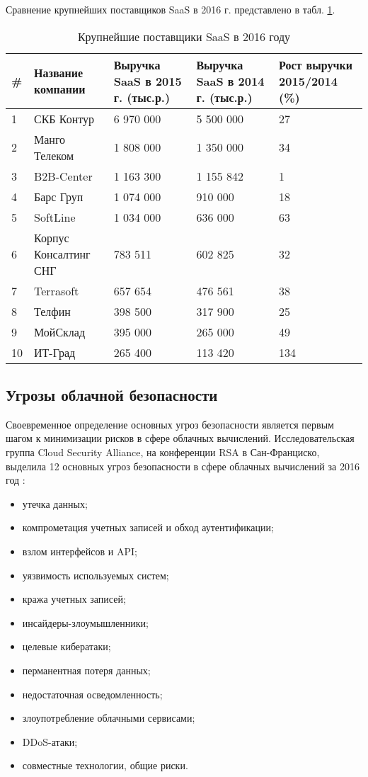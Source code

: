 Сравнение крупнейших поставщиков SaaS в 2016 г. \cite{cnews} представлено в табл. \ref{saas-table}.
\begin{table}[H]
  \caption{Крупнейшие поставщики SaaS в 2016 году}\label{saas-table}
  \begin{tabular}{|p{0.5cm}|p{3.5cm}|p{3.5cm}|p{3.5cm}|p{3.5cm}|}
  \hline \# & Название компании & Выручка SaaS в 2015 г. (тыс.р.) & Выручка SaaS в 2014 г. (тыс.р.) & Рост выручки 2015/2014 (\%) \\
  \hline 1 & СКБ Контур & 6 970 000 & 5 500 000 & 27 \\
  \hline 2 & Манго Телеком & 1 808 000 & 1 350 000 & 34 \\
  \hline 3 & B2B-Center & 1 163 300 & 1 155 842 & 1 \\
  \hline 4 & Барс Груп & 1 074 000 & 910 000 & 18 \\
  \hline 5 & SoftLine & 1 034 000 & 636 000 & 63 \\
  \hline 6 & Корпус Консалтинг СНГ & 783 511 & 602 825 & 32 \\
  \hline 7 & Terrasoft & 657 654 & 476 561 & 38 \\
  \hline 8 & Телфин & 398 500 & 317 900 & 25 \\
  \hline 9 & МойСклад & 395 000 & 265 000 & 49 \\
  \hline 10 & ИТ-Град & 265 400 & 113 420 & 134 \\
  \hline
  \end{tabular}
\end{table}

\subsection{Угрозы облачной безопасности}

Своевременное определение основных угроз безопасности является первым шагом к минимизации рисков в сфере облачных вычислений.
Исследовательская группа Cloud Security Alliance, на конференции RSA в Сан-Франциско, выделила 12 основных угроз безопасности в сфере облачных вычислений за 2016 год \cite{csa}:
\begin{itemize}
  \item утечка данных;
  \item компрометация учетных записей и обход аутентификации;
  \item взлом интерфейсов и API;
  \item уязвимость используемых систем;
  \item кража учетных записей;
  \item инсайдеры-злоумышленники;
  \item целевые кибератаки;
  \item перманентная потеря данных;
  \item недостаточная осведомленность;
  \item злоупотребление облачными сервисами;
  \item DDoS-атаки;
  \item совместные технологии, общие риски.
\end{itemize}

